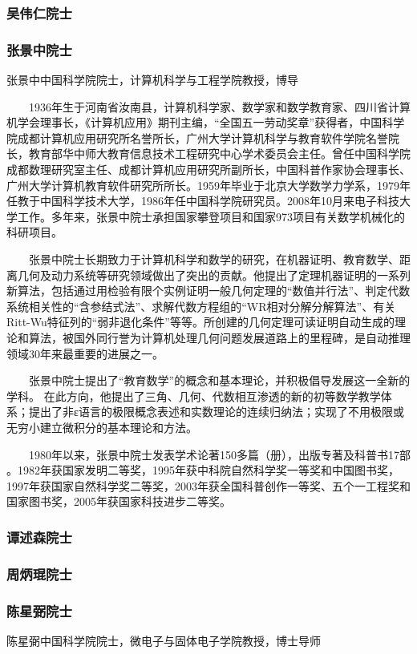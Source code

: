 \documentclass[UTF8]{ctexart}
\begin{document}
    \subsubsection{吴伟仁院士}
    \subsubsection{张景中院士}
    张景中中国科学院院士，计算机科学与工程学院教授，博导

　　1936年生于河南省汝南县，计算机科学家、数学家和数学教育家、四川省计算机学会理事长，《计算机应用》期刊主编，“全国五一劳动奖章”获得者，中国科学院成都计算机应用研究所名誉所长，广州大学计算机科学与教育软件学院名誉院长，教育部华中师大教育信息技术工程研究中心学术委员会主任。曾任中国科学院成都数理研究室主任、成都计算机应用研究所副所长，中国科普作家协会理事长、广州大学计算机教育软件研究所所长。1959年毕业于北京大学数学力学系，1979年任教于中国科学技术大学，1986年任中国科学院研究员。2008年10月来电子科技大学工作。多年来，张景中院士承担国家攀登项目和国家973项目有关数学机械化的科研项目。

　　张景中院士长期致力于计算机科学和数学的研究，在机器证明、教育数学、距离几何及动力系统等研究领域做出了突出的贡献。他提出了定理机器证明的一系列新算法，包括通过用检验有限个实例证明一般几何定理的“数值并行法”、判定代数系统相关性的“含参结式法”、求解代数方程组的“WR相对分解分解算法”、有关Ritt-Wu特征列的“弱非退化条件”等等。所创建的几何定理可读证明自动生成的理论和算法，被国外同行誉为计算机处理几何问题发展道路上的里程碑，是自动推理领域30年来最重要的进展之一。

　　张景中院士提出了“教育数学”的概念和基本理论，并积极倡导发展这一全新的学科。 在此方向，他提出了三角、几何、代数相互渗透的新的初等数学教学体系；提出了非ε语言的极限概念表述和实数理论的连续归纳法；实现了不用极限或无穷小建立微积分的基本理论和方法。

　　1980年以来，张景中院士发表学术论著150多篇（册），出版专著及科普书17部 。1982年获国家发明二等奖，1995年获中科院自然科学奖一等奖和中国图书奖，1997年获国家自然科学奖二等奖，2003年获全国科普创作一等奖、五个一工程奖和国家图书奖，2005年获国家科技进步二等奖。

    \subsubsection{谭述森院士}
    \subsubsection{周炳琨院士}
    \subsubsection{陈星弼院士}
    陈星弼中国科学院院士，微电子与固体电子学院教授，博士导师
\end{document}
